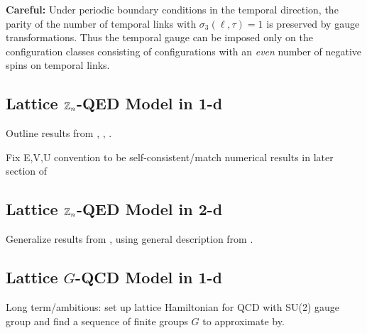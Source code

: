\documentclass[11pt,reqno]{amsart}
\begin{document}
	\textbf{Careful:} Under periodic boundary conditions in the temporal direction, the parity of the number of temporal links with $\sigma_3(\ell,\tau)=1$ is preserved by gauge transformations.
	Thus the temporal gauge can be imposed only on the configuration classes consisting of configurations with an \emph{even} number of negative spins on temporal links.
		
	\subsection{Lattice $\mathbb{Z}_n$-QED Model in 1-d}
	
	Outline results from \cite{Ercolessi18}, \cite{Notarnicola15}, \cite{Wiese13}.
	
	Fix E,V,U convention to be self-consistent/match numerical results in later section of \cite{Ercolessi18}
	
	\subsection{Lattice $\mathbb{Z}_n$-QED Model in 2-d}
	
	Generalize results from \cite{Ercolessi18}, \cite{Notarnicola15} using general description from \cite{Wiese13}.
	
	\subsection{Lattice $G$-QCD Model in 1-d}
	
	Long term/ambitious: set up lattice Hamiltonian for QCD with SU(2) gauge group and find a sequence of finite groups $G$ to approximate by.
	
	
	
	
\end{document}
